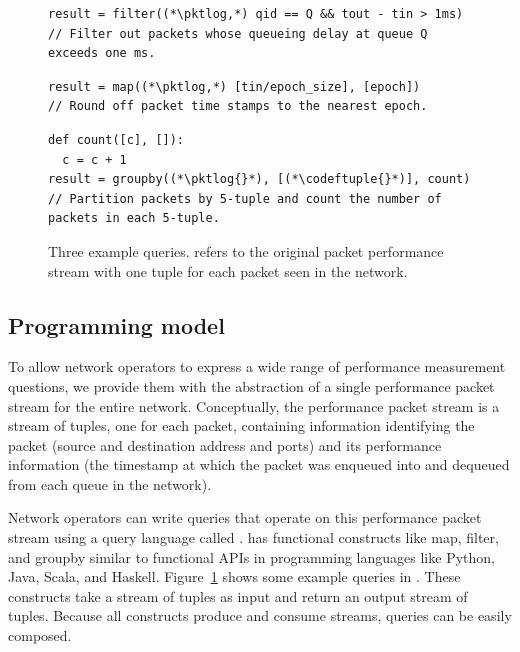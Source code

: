 \begin{figure}
\begin{minipage}[!h]{\textwidth}
\centering
\begin{lstlisting}
result = filter((*\pktlog,*) qid == Q && tout - tin > 1ms)
// Filter out packets whose queueing delay at queue Q exceeds one ms.
\end{lstlisting}
\end{minipage}

\begin{minipage}[!h]{\textwidth}
\centering
\begin{lstlisting}
result = map((*\pktlog,*) [tin/epoch_size], [epoch])
// Round off packet time stamps to the nearest epoch.
\end{lstlisting}
\end{minipage}

\begin{minipage}[!h]{\textwidth}
\begin{lstlisting}
def count([c], []):
  c = c + 1
result = groupby((*\pktlog{}*), [(*\codeftuple{}*)], count)
// Partition packets by 5-tuple and count the number of packets in each 5-tuple.
\end{lstlisting}
\end{minipage}
\caption{Three example \TheSystem queries. {\ct \pktlog{}} refers to the
original packet performance stream with one tuple for each packet seen in the
network.}
\label{fig:example_queries}
\end{figure}

\subsection{Programming model} To allow network operators to express a wide
range of performance measurement questions, we provide them with the
abstraction of a single performance packet stream for the entire network.
Conceptually, the performance packet stream is a stream of tuples, one for each
packet, containing information identifying the packet (source and destination
address and ports) and its performance information (the timestamp at which the
packet was enqueued into and dequeued from each queue in the network).

Network operators can write queries that operate on this performance packet
stream using a query language called \TheSystem. \TheSystem has functional
constructs like {\ct map}, {\ct filter}, and {\ct groupby} similar to
functional APIs in programming languages like Python, Java, Scala, and Haskell.
Figure~\ref{fig:example_queries} shows some example queries in \TheSystem.
These constructs take a stream of tuples as input and return an output stream
of tuples. Because all constructs produce and consume streams, \TheSystem
queries can be easily composed.

